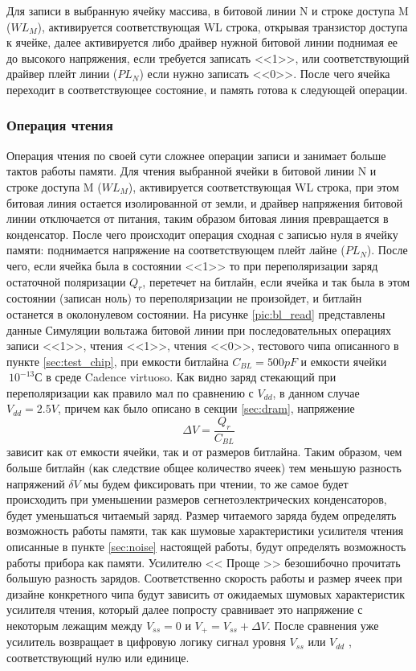 \documentclass[a4paper,12pt]{article} %
\begin{document}
Для записи в выбранную ячейку массива, в битовой линии N и строке доступа M ($WL_M$), активируется соответствующая WL строка, открывая транзистор доступа к ячейке, далее активируется либо драйвер нужной битовой линии поднимая ее до высокого напряжения, если требуется записать <<1>>, или соответствующий драйвер плейт линии ($PL_N$) если нужно записать <<0>>. После чего ячейка  переходит в соответствующее состояние, и память готова к следующей операции.

\subsubsection{Операция чтения}
Операция чтения по своей сути сложнее операции записи и занимает больше тактов работы памяти. Для чтения выбранной ячейки в битовой линии N и строке доступа M ($WL_M$), активируется соответствующая WL строка, при этом битовая линия остается изолированной от земли, и драйвер напряжения битовой линии отключается от питания, таким образом битовая линия превращается в конденсатор. После чего происходит операция сходная с записью нуля в ячейку памяти: поднимается напряжение на соответствующем плейт лайне ($PL_N$). После чего, если ячейка была в состоянии <<1>> то при переполяризации заряд остаточной поляризации $Q_r$, перетечет на битлайн, если ячейка и так была в этом состоянии (записан ноль) то переполяризации не произойдет, и битлайн останется в околонулевом состоянии. На рисунке \ref{pic:bl_read} представлены данные Симуляции вольтажа битовой линии при последовательных операциях записи <<1>>, чтения <<1>>, чтения <<0>>, тестового чипа описанного в пункте \ref{sec:test_chip}, при емкости битлайна  $C_{BL}=500pF $ и емкости ячейки $~10^{-13} С $ в среде Cadence virtuoso. Как видно заряд стекающий при переполяризации как правило мал по сравнению с $V_{dd} $, в данном случае  $V_{dd}=2.5V $, причем как было описано в секции \ref{sec:dram}, напряжение $$ \Delta V = \frac{Q_r}{C_{BL}}   $$ зависит как от емкости ячейки, так и от размеров битлайна. Таким образом, чем больше битлайн (как следствие общее количество ячеек) тем меньшую разность  напряжений $ \delta V $ мы будем фиксировать при чтении, то же самое будет происходить при уменьшении размеров сегнетоэлектрических конденсаторов, будет уменьшаться читаемый заряд. Размер читаемого заряда будем определять возможность работы памяти, так как шумовые характеристики усилителя чтения описанные в пункте \ref{sec:noise} настоящей работы, будут определять возможность работы прибора как памяти. Усилителю << Проще >> безошибочно прочитать большую разность зарядов. Соответственно скорость работы и размер ячеек при дизайне конкретного чипа будут зависить от ожидаемых  шумовых характеристик усилителя чтения, который далее попросту сравнивает это напряжение с некоторым лежащим между $ V_{ss}= 0  $ и $ V_{+}= V_{ss} + \Delta V   $. После сравнения уже усилитель возвращает в цифровую логику сигнал уровня $V_{ss}  $ или $V_{dd}  $ , соответствующий нулю или единице.
\end{document}
